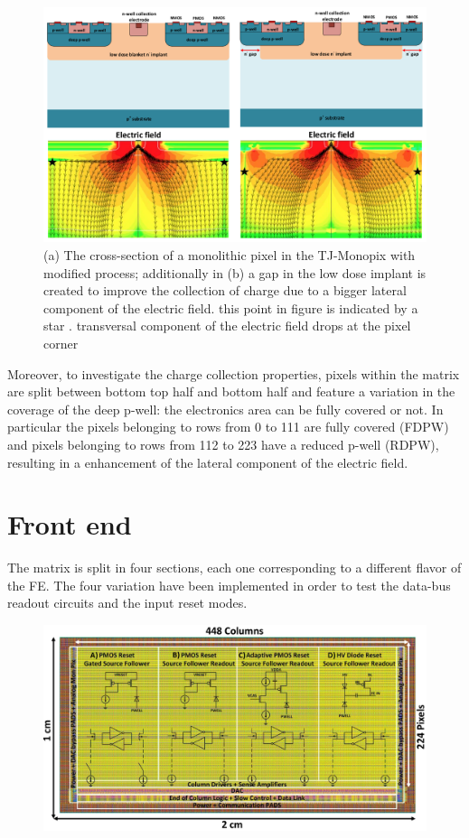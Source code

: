     \begin{figure}[h!]
        \centering
        \includegraphics[width=.9\linewidth]{figures/Monopix1/Monopix1_section_scheme.png}
        \caption{(a) The cross-section of a monolithic pixel in the TJ-Monopix with modified process; additionally in (b) a gap in the low dose implant is created to improve the collection of charge due to a bigger lateral component of the electric field. this point in figure  is indicated by a star . transversal component of the electric field drops at the pixel corner}
        \label{fig:Monopix1_section_scheme}
    \end{figure}

    Moreover, to investigate the charge collection properties, pixels within the matrix are split between bottom top half and bottom half and feature a variation in the coverage of the deep p-well: the electronics area can be fully covered or not. In particular the pixels belonging to rows from 0 to 111 are fully covered (FDPW) and pixels belonging to rows from 112 to 223 have a reduced p-well (RDPW), resulting in a enhancement of the lateral component of the electric field.

\section{Front end}
    The matrix is split in four sections, each one corresponding to a different flavor of the FE. The four variation have been implemented in order to test the data-bus readout circuits and the input reset modes.
    \begin{figure}[h!]
        \centering
        \includegraphics[width=.8\linewidth]{figures/Monopix1/Monopix1_flavors.png}
        \caption{}
        \label{fig:Monopix1_flavors}
    \end{figure}

